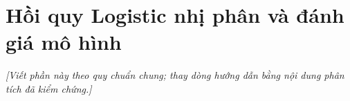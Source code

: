 \section{Hồi quy Logistic nhị phân và đánh giá mô hình}
\noindent\textit{[Viết phần này theo quy chuẩn chung; thay dòng hướng dẫn bằng nội dung phân tích đã kiểm chứng.]}

